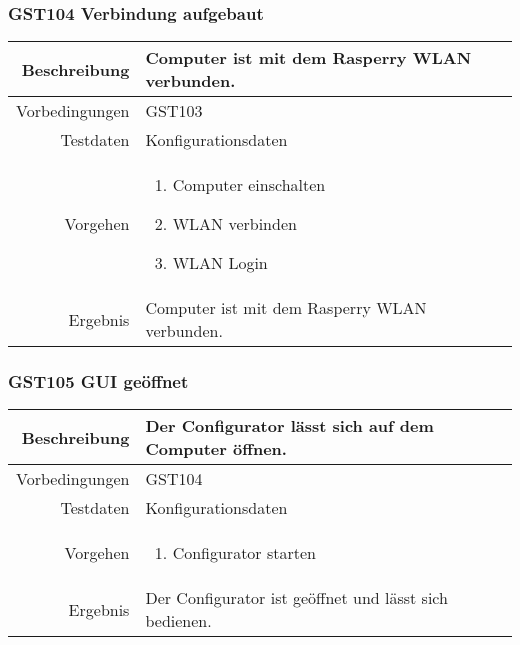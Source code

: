 \subsubsection{GST104 Verbindung aufgebaut}
\begin{table}[h!]
	\renewcommand{\arraystretch}{1.5}
	\begin{tabular}{|r|p{13cm}|}
		\hline Beschreibung & Computer ist mit dem Rasperry WLAN verbunden. \\ 
		\hline Vorbedingungen &  GST103\\ 
		\hline Testdaten & Konfigurationsdaten \\ 
		\hline Vorgehen & 
		\begin{enumerate}
			\item Computer einschalten
			\item WLAN verbinden
			\item WLAN Login
		\end{enumerate} \\ 
		\hline Ergebnis & Computer ist mit dem Rasperry WLAN verbunden. \\ 
		\hline 
	\end{tabular}
\end{table}

\subsubsection{GST105 GUI geöffnet}
\begin{table}[h!]
	\renewcommand{\arraystretch}{1.5}
	\begin{tabular}{|r|p{13cm}|}
		\hline Beschreibung & Der Configurator lässt sich auf dem Computer öffnen. \\ 
		\hline Vorbedingungen &  GST104\\ 
		\hline Testdaten & Konfigurationsdaten \\ 
		\hline Vorgehen & 
		\begin{enumerate}
			\item Configurator starten
		\end{enumerate} \\ 
		\hline Ergebnis & Der Configurator ist geöffnet und lässt sich bedienen. \\ 
		\hline 
	\end{tabular}
\end{table}
\newpage

